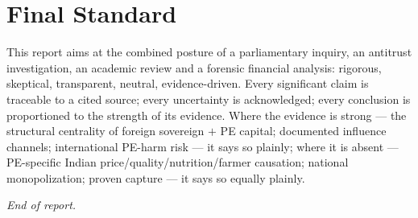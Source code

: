 \documentclass[11pt,a4paper]{article}
\begin{document}
\section*{Final Standard}
This report aims at the combined posture of a parliamentary inquiry, an antitrust investigation, an academic review and a forensic financial analysis: rigorous, skeptical, transparent, neutral, evidence-driven. Every significant claim is traceable to a cited source; every uncertainty is acknowledged; every conclusion is proportioned to the strength of its evidence. Where the evidence is strong --- the structural centrality of foreign sovereign $+$ PE capital; documented influence channels; international PE-harm risk --- it says so plainly; where it is absent --- PE-specific Indian price/quality/nutrition/farmer causation; national monopolization; proven capture --- it says so equally plainly.

\vspace{1em}
\begin{center}
\textit{End of report.}
\end{center}
\end{document}
